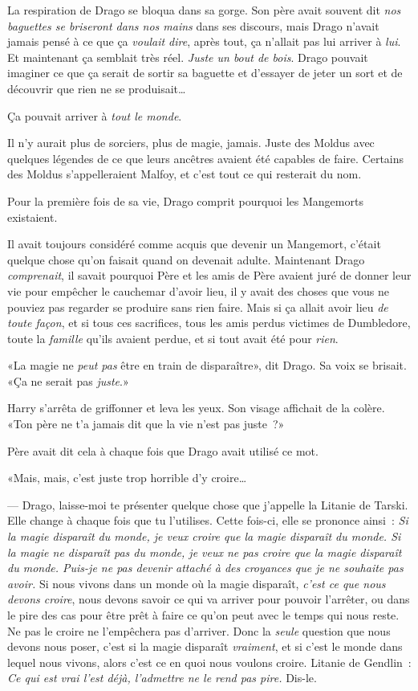 La respiration de Drago se bloqua dans sa gorge. Son père avait souvent dit \emph{nos baguettes se briseront dans nos mains} dans ses discours, mais Drago n'avait jamais pensé à ce que ça \emph{voulait dire}, après tout, ça n'allait pas lui arriver à \emph{lui}. Et maintenant ça semblait très réel. \emph{Juste un bout de bois}. Drago pouvait imaginer ce que ça serait de sortir sa baguette et d'essayer de jeter un sort et de découvrir que rien ne se produisait…

Ça pouvait arriver à \emph{tout le monde}.

Il n'y aurait plus de sorciers, plus de magie, jamais. Juste des Moldus avec quelques légendes de ce que leurs ancêtres avaient été capables de faire. Certains des Moldus s'appelleraient Malfoy, et c'est tout ce qui resterait du nom.

Pour la première fois de sa vie, Drago comprit pourquoi les Mangemorts existaient.

Il avait toujours considéré comme acquis que devenir un Mangemort, c'était quelque chose qu'on faisait quand on devenait adulte. Maintenant Drago \emph{comprenait}, il savait pourquoi Père et les amis de Père avaient juré de donner leur vie pour empêcher le cauchemar d'avoir lieu, il y avait des choses que vous ne pouviez pas regarder se produire sans rien faire. Mais si ça allait avoir lieu \emph{de toute façon}, et si tous ces sacrifices, tous les amis perdus victimes de Dumbledore, toute la \emph{famille} qu'ils avaient perdue, et si tout avait été pour \emph{rien}.

«La magie ne \emph{peut pas} être en train de disparaître», dit Drago. Sa voix se brisait. «Ça ne serait pas \emph{juste}.»

Harry s'arrêta de griffonner et leva les yeux. Son visage affichait de la colère. «Ton père ne t'a jamais dit que la vie n'est pas juste~?»

Père avait dit cela à chaque fois que Drago avait utilisé ce mot.

«Mais, mais, c'est juste trop horrible d'y croire…

--- Drago, laisse-moi te présenter quelque chose que j'appelle la Litanie de Tarski. Elle change à chaque fois que tu l'utilises. Cette fois-ci, elle se prononce ainsi~: \emph{Si la magie disparaît du monde, je veux croire que la magie disparaît du monde. Si la magie ne disparaît pas du monde, je veux ne pas croire que la magie disparaît du monde. Puis-je ne pas devenir attaché à des croyances que je ne souhaite pas avoir.} Si nous vivons dans un monde où la magie disparaît, \emph{c'est ce que nous devons croire}, nous devons savoir ce qui va arriver pour pouvoir l'arrêter, ou dans le pire des cas pour être prêt à faire ce qu'on peut avec le temps qui nous reste. Ne pas le croire ne l'empêchera pas d'arriver. Donc la \emph{seule} question que nous devons nous poser, c'est si la magie disparaît \emph{vraiment}, et si c'est le monde dans lequel nous vivons, alors c'est ce en quoi nous voulons croire. Litanie de Gendlin~: \emph{Ce qui est vrai l'est déjà, l'admettre ne le rend pas pire.} Dis-le.

